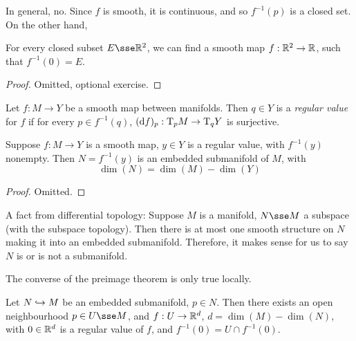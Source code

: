 \documentclass{article}
\begin{document}
In general, no. Since \(f\) is smooth, it is continuous, and so \(f^{-1}(p)\) is a closed set. On the other hand,

\begin{proposition}    
    For every closed subset \(E \sse \R^2\), we can find a smooth map \(f : \mathbb{R}^2 \to \mathbb{R}\), such that \(f^{-1}(0) = E\).
\end{proposition}

\begin{proof}
    Omitted, optional exercise.
\end{proof}

\begin{definition}
    Let \(f : M \to Y\) be a smooth map between manifolds. Then \(q \in Y\) is a \emph{regular value} for \(f\) if for every \(p \in f^{-1}(q)\), \((\dd f)_p : \mathrm{T}_p M \to \mathrm{T}_q Y\) is surjective.
\end{definition}

\begin{theorem}
     Suppose \(f : M \to Y\) is a smooth map, \(y \in Y\) is a regular value, with \(f^{-1}(y)\) nonempty. Then \(N = f^{-1}(y)\) is an embedded submanifold of \(M\), with
    \[\dim(N) = \dim(M) - \dim(Y)\]
\end{theorem}

\begin{proof}
    Omitted.
\end{proof}

A fact from differential topology: Suppose \(M\) is a manifold, \(N \sse M\) a subspace (with the subspace topology). Then there is at most one smooth structure on \(N\) making it into an embedded submanifold. Therefore, it makes sense for us to say \(N\) is or is not a submanifold.

The converse of the preimage theorem is only true locally.

\begin{proposition}
    Let \(N \hookrightarrow M\) be an embedded submanifold, \(p \in N\). Then there exists an open neighbourhood \(p \in U \sse M\), and \(f : U \to \mathbb{R}^d\), \(d = \dim(M) - \dim(N)\), with \(0 \in \mathbb{R}^d\) is a regular value of \(f\), and \(f^{-1}(0) = U \cap f^{-1}(0)\).
\end{proposition}
\end{document}
